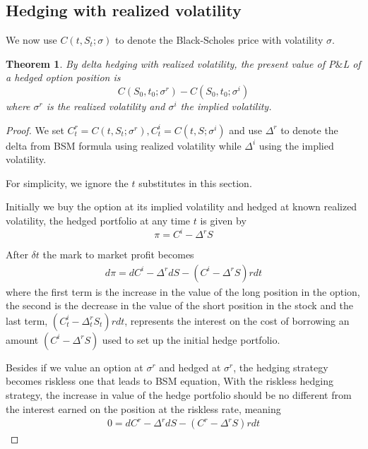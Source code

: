 \documentclass[10pt]{article}
\theoremstyle{plain}
\newtheorem{theorem}{Theorem}[section]
\numberwithin{equation}{section}
\numberwithin{table}{section}
\newcommand{\s}{\sigma}
\newcommand{\de}{\delta}
\begin{document}
\subsection{Hedging with realized volatility}

We now use $C(t,S_t; \s)$ to denote the Black-Scholes price with volatility $\s$. 

\begin{theorem}
    By delta hedging with realized volatility, the present value of P$\&$L of a hedged option position is 
    \[
        C(S_0,t_0;\s^r)-C(S_0,t_0;\s^i)    
    \]
    where $\s^r$ is the realized volatility and $\s^i$ the implied volatility.

    \label{theorem_hedging_real_vol}
\end{theorem}


\begin{proof}
    We set $C_t^r = C(t, S_t;\s^r), C_t^i = C(t, S;\s^i)$ and use $\Delta^r$ to denote the delta from BSM formula using realized volatility while $\Delta^i$
    using the implied volatility. 
    
    For simplicity, we ignore the $t$ substitutes in this section.

    Initially we buy the option at its implied volatility and hedged at known realized volatility, the hedged portfolio
    at any time $t$ is given by
    \[
        \pi = C^i - \Delta^r S    
    \]

    After $\de t$ the mark to market profit becomes
    \begin{eqnarray}
        d\pi = dC^i - \Delta^r dS - (C^i -\Delta^r S)rdt  
        \label{hedging_dynamic_real_vol}     
    \end{eqnarray}
    where the first term is the increase in the value of the long position in the option, the
    second is the decrease in the value of the short position in the stock and the last term, $(C_t^i -\Delta_t^r S_t)rdt$, represents the interest on the cost
    of borrowing an amount $(C^i -\Delta^r S)$ used to set up the initial hedge portfolio.

    Besides if we value an option at $\s^r$ and hedged at $\s^r$, the hedging strategy becomes riskless one that leads to BSM equation, With the riskless
    hedging strategy, the increase in value of the hedge portfolio should be no different from the interest earned on the position at the riskless rate, meaning 
    \begin{eqnarray}
        0 = dC^r - \Delta^r dS - (C^r -\Delta^r S)rdt 
        \label{hedging_dynamic_riskless}
    \end{eqnarray}
    

\end{proof}
\end{document}
